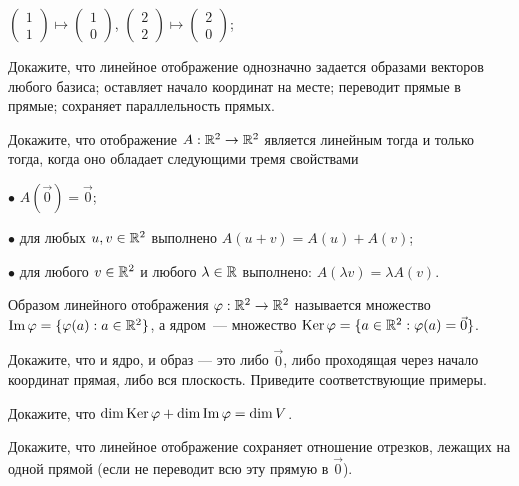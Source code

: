 \documentclass[a4paper,12pt]{article}
\begin{document}
  $\begin{pmatrix} 1 \\ 1 \end{pmatrix} \mapsto \begin{pmatrix} 1 \\ 0 \end{pmatrix}$,  $\begin{pmatrix} 2 \\ 2 \end{pmatrix} \mapsto \begin{pmatrix} 2 \\ 0 \end{pmatrix}$;


 Докажите, что линейное отображение
  однозначно задается образами векторов любого базиса;
 оставляет начало координат на месте;
 переводит прямые в прямые;
 сохраняет параллельность прямых.



  Докажите, что отображение $A : \mathbb{R}^2 \rightarrow \mathbb{R}^2$ является линейным тогда и только тогда, когда оно обладает следующими тремя свойствами

$\bullet$ $A(\vec{0})=\vec{0}$;

$\bullet$ для любых $u,v \in \mathbb{R}^2$ выполнено $A(u+v) = A(u) + A(v)$;

$\bullet$ для любого  $v \in \mathbb{R}^2$ и любого $\lambda \in \mathbb{R}$ выполнено: $A(\lambda v) = \lambda A(v)$.


  Образом линейного отображения $\varphi: \mathbb{R}^2 \rightarrow \mathbb{R}^2$ называется множество\break $\mathop{\mathrm{Im}} \varphi = \{\varphi(a): a \in \mathbb{R}^2\}$, а  ядром\ --- множество $\operatorname{Ker} \varphi = \{a \in \mathbb{R}^2: \varphi(a) = \vec{0}\}$.
	
Докажите, что и ядро, и образ --- это либо $\vec{0}$, либо проходящая через начало координат прямая, либо вся плоскость.
 Приведите соответствующие примеры.

	
 Докажите, что $\dim \operatorname{Ker} \varphi + \dim \mathop{\mathrm{Im}} \varphi = \dim V$.

 Докажите, что линейное отображение сохраняет отношение отрезков, лежащих на одной прямой (если не переводит всю эту прямую в $\vec{0}$).
\end{document}
